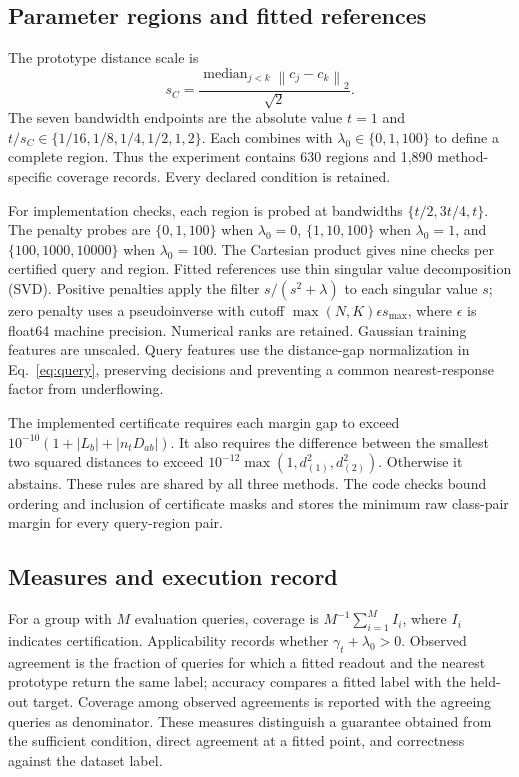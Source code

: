 \documentclass[preprint,12pt]{elsarticle}
\newcommand{\norm}[1]{\left\lVert#1\right\rVert}
\begin{document}
\subsection{Parameter regions and fitted references}
The prototype distance scale is
\begin{equation}
 s_C=\frac{\operatorname{median}_{j<k}\norm{c_j-c_k}_2}{\sqrt{2}}.
 \label{eq:scale}
\end{equation}
The seven bandwidth endpoints are the absolute value $t=1$ and $t/s_C\in\{1/16,\allowbreak1/8,\allowbreak1/4,\allowbreak1/2,\allowbreak1,\allowbreak2\}$. Each combines with $\lambda_0\in\{0,1,100\}$ to define a complete region. Thus the experiment contains 630 regions and 1,890 method-specific coverage records. Every declared condition is retained.

For implementation checks, each region is probed at bandwidths $\{t/2,3t/4,t\}$. The penalty probes are $\{0,1,100\}$ when $\lambda_0=0$, $\{1,10,100\}$ when $\lambda_0=1$, and $\{100,1000,10000\}$ when $\lambda_0=100$. The Cartesian product gives nine checks per certified query and region. Fitted references use thin singular value decomposition (SVD). Positive penalties apply the filter $s/(s^2+\lambda)$ to each singular value $s$; zero penalty uses a pseudoinverse with cutoff $\max(N,K)\epsilon s_{\max}$, where $\epsilon$ is float64 machine precision. Numerical ranks are retained. Gaussian training features are unscaled. Query features use the distance-gap normalization in Eq.~\eqref{eq:query}, preserving decisions and preventing a common nearest-response factor from underflowing.

The implemented certificate requires each margin gap to exceed $10^{-10}(1+|L_b|+|n_tD_{ab}|)$. It also requires the difference between the smallest two squared distances to exceed $10^{-12}\max(1,d_{(1)}^2,d_{(2)}^2)$. Otherwise it abstains. These rules are shared by all three methods. The code checks bound ordering and inclusion of certificate masks and stores the minimum raw class-pair margin for every query-region pair.

\subsection{Measures and execution record}
For a group with $M$ evaluation queries, coverage is $M^{-1}\sum_{i=1}^M I_i$, where $I_i$ indicates certification. Applicability records whether $\gamma_t+\lambda_0>0$. Observed agreement is the fraction of queries for which a fitted readout and the nearest prototype return the same label; accuracy compares a fitted label with the held-out target. Coverage among observed agreements is reported with the agreeing queries as denominator. These measures distinguish a guarantee obtained from the sufficient condition, direct agreement at a fitted point, and correctness against the dataset label.
\end{document}
